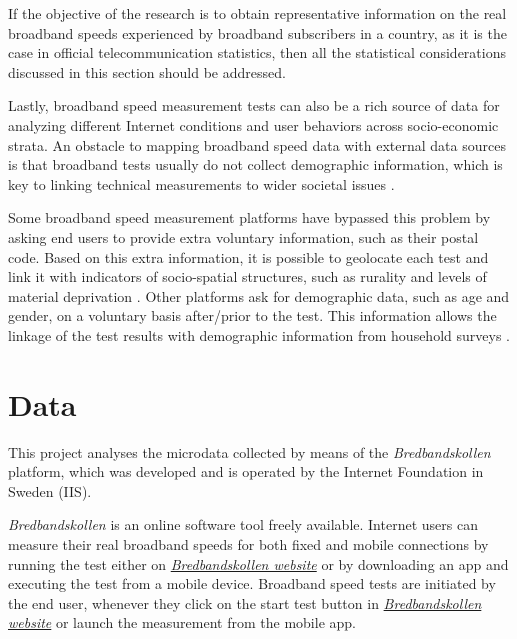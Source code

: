 \documentclass[12pt]{article}
\begin{document}
If the objective of the research is to obtain representative information on the real broadband speeds experienced by broadband subscribers in a country, as it is the case in official telecommunication statistics, then all the statistical considerations discussed in this section should be addressed.

Lastly, broadband speed measurement tests can also be a rich source of data for analyzing different Internet conditions and user behaviors across socio-economic strata. An obstacle to mapping broadband speed data with external data sources is that broadband tests usually do not collect demographic information, which is key to linking technical measurements to wider societal issues \citep[for an example, see Chapter 6 in][]{misr2016}. 

Some broadband speed measurement platforms have bypassed this problem by asking end users to provide extra voluntary information, such as their postal code. Based on this extra information, it is possible to geolocate each test and link it with indicators of socio-spatial structures, such as rurality and levels of material deprivation \citep{riddlesden2014}. Other platforms ask for demographic data, such as age and gender, on a voluntary basis after/prior to the test. This information allows the linkage of the test results with demographic information from household surveys \citep{opt2012}. 
   

\section{Data}

This project analyses the microdata collected by means of the \textit{Bredbandskollen} platform, which was developed and is operated by the Internet Foundation in Sweden (IIS).

\textit{Bredbandskollen} is an online software tool freely available. Internet users can measure their real broadband speeds for both fixed and mobile connections by running the test either on \href{https://www.bredbandskollen.se/}{\textit{Bredbandskollen website}} or by downloading an app and executing the test from a mobile device. Broadband speed tests are initiated by the end user, whenever they click on the start test button in \href{https://www.bredbandskollen.se/}{\textit{Bredbandskollen website}} or launch the measurement from the mobile app.   
\end{document}
